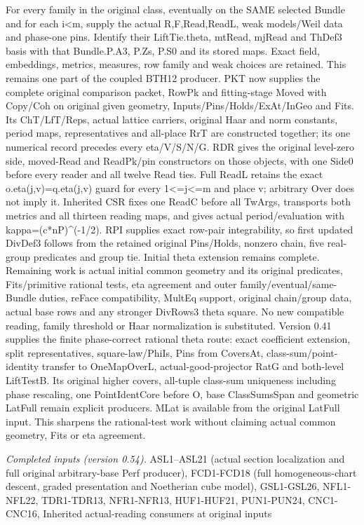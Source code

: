 For every family in the original class, eventually on the SAME selected Bundle and for each i<m, supply the actual R,F,Read,ReadL, weak models/Weil data and phase-one pins. Identify their LiftTie.theta, mtRead, mjRead and ThDef3 basis with that Bundle.P.A3, P.Zs, P.S0 and its stored maps. Exact field, embeddings, metrics, measures, row family and weak choices are retained. This remains one part of the coupled BTH12 producer. PKT now supplies the complete original comparison packet, RowPk and fitting-stage Moved with Copy/Coh on original given geometry, Inputs/Pins/Holds/ExAt/InGeo and Fits. Its ChT/LfT/Reps, actual lattice carriers, original Haar and norm constants, period maps, representatives and all-place RrT are constructed together; its one numerical record precedes every eta/V/S/N/G. RDR gives the original level-zero side, moved-Read and ReadPk/pin constructors on those objects, with one Side0 before every reader and all twelve Read ties. Full ReadL retains the exact o.eta(j,v)=q.eta(j,v) guard for every 1<=j<=m and place v; arbitrary Over does not imply it. Inherited CSR fixes one ReadC before all TwArgs, transports both metrics and all thirteen reading maps, and gives actual period/evaluation with kappa=(c*nP)\textasciicircum{}(-1/2). RPI supplies exact row-pair integrability, so first updated DivDef3 follows from the retained original Pins/Holds, nonzero chain, five real-group predicates and group tie. Initial theta extension remains complete. Remaining work is actual initial common geometry and its original predicates, Fits/primitive rational tests, eta agreement and outer family/eventual/same-Bundle duties, reFace compatibility, MultEq support, original chain/group data, actual base rows and any stronger DivRows3 theta square. No new compatible reading, family threshold or Haar normalization is substituted. Version 0.41 supplies the finite phase-correct rational theta route: exact coefficient extension, split representatives, square-law/PhiIs, Pins from CoversAt, class-sum/point-identity transfer to OneMapOverL, actual-good-projector RatG and both-level LiftTestB. Its original higher covers, all-tuple class-sum uniqueness including phase rescaling, one PointIdentCore before O, base ClassSumsSpan and geometric LatFull remain explicit producers. MLat is available from the original LatFull input. This sharpens the rational-test work without claiming actual common geometry, Fits or eta agreement.

\emph{Completed inputs (version 0.54).} ASL1–ASL21 (actual section localization and full original arbitrary-base Perf producer), FCD1-FCD18 (full homogeneous-chart descent, graded presentation and Noetherian cube model), GSL1-GSL26, NFL1-NFL22, TDR1-TDR13, NFR1-NFR13, HUF1-HUF21, PUN1-PUN24, CNC1-CNC16, Inherited actual-reading consumers at original inputs

